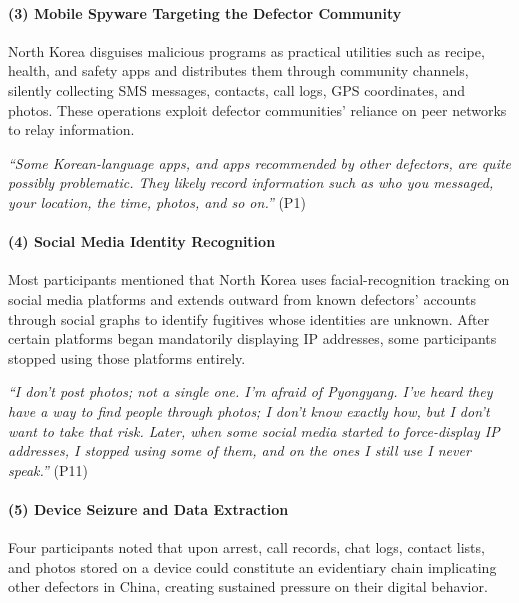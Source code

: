 \documentclass[conference,compsoc]{IEEEtran}
\begin{document}
\paragraph{\textbf{(3) Mobile Spyware Targeting the Defector Community}}
North Korea disguises malicious programs as practical utilities such as recipe, health, and safety apps and distributes them through community channels, silently collecting SMS messages, contacts, call logs, GPS coordinates, and photos. These operations exploit defector communities' reliance on peer networks to relay information.

\begin{displayquote}
\textit{``Some Korean-language apps, and apps recommended by other defectors, are quite possibly problematic. They likely record information such as who you messaged, your location, the time, photos, and so on.''} (P1)
\end{displayquote}

\paragraph{\textbf{(4) Social Media Identity Recognition}}
Most participants mentioned that North Korea uses facial-recognition tracking on social media platforms and extends outward from known defectors' accounts through social graphs to identify fugitives whose identities are unknown. After certain platforms began mandatorily displaying IP addresses, some participants stopped using those platforms entirely.

\begin{displayquote}
\textit{``I don't post photos; not a single one. I'm afraid of Pyongyang. I've heard they have a way to find people through photos; I don't know exactly how, but I don't want to take that risk. Later, when some social media started to force-display IP addresses, I stopped using some of them, and on the ones I still use I never speak.''} (P11)
\end{displayquote}

\paragraph{\textbf{(5) Device Seizure and Data Extraction}}
Four participants noted that upon arrest, call records, chat logs, contact lists, and photos stored on a device could constitute an evidentiary chain implicating other defectors in China, creating sustained pressure on their digital behavior.
\end{document}
